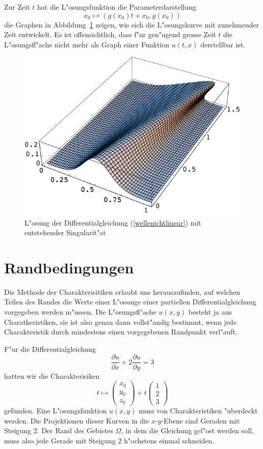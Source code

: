 Zur Zeit $t$ hat die L"osungsfunktion die Parameterdarstellung
\[
x_0\mapsto (g(x_0)t+x_0,g(x_0))
\]
die Graphen in Abbildung~\ref{g} zeigen, wie sich die L"osungskurve
mit zunehmender Zeit entwickelt.
Es ist offensichtlich, dass f"ur gen"ugend grosse Zeit $t$ die
L"osungsfl"ache nicht mehr als Graph einer Funktion $u(t,x)$ derstellbar ist.
\begin{figure}
\begin{center}
\includegraphics[width=\hsize]{graphics/welle}
\end{center}
\caption{L"osung der Differentialgleichung (\ref{wellenichtlinear}) mit
entstehender Singularit"at\label{g}}
\end{figure}

\section{Randbedingungen}
Die Methode der Charakterisitiken erlaubt uns herauszufinden, auf welchen
Teilen des Randes die Werte einer L"osunge einer partiellen
Differentialgleichung vorgegeben werden m"ussen.
Die L"osungsfl"ache $u(x,y)$ besteht ja aus Charatkeristiken, sie ist also
genau dann vollst"andig bestimmt, wenn jede Charakteristik durch mindestens 
einen vorgegebenen Randpunkt verl"auft.

F"ur die Differentialgleichung
\[
\frac{\partial u}{\partial x}+2\frac{\partial u}{\partial y}=3
\]
hatten wir die Charakterisiken 
\[
t\mapsto\begin{pmatrix}x_0\\y_0\\z_0\end{pmatrix}+t\begin{pmatrix}1\\2\\3\end{pmatrix}
\]
gefunden. Eine L"osungsfunktion $u(x,y)$ muss von Charakteristiken
"uberdeckt werden. 
Die Projektionen dieser Kurven in die $x$-$y$-Ebene sind Geraden
mit Steigung $2$. Der Rand des Gebietes $\Omega$, in dem die Gleichung gel"ost
werden soll, muss also jede Gerade mit Steigung $2$ h"ochstens einmal
schneiden.

